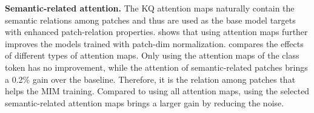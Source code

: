 \documentclass{article} \usepackage{iclr2023_conference,times}
\newcommand{\myPara}[1]{\vspace{-.05in} \noindent\textbf{#1}}
\begin{document}
\myPara{Semantic-related attention.}
The KQ attention maps naturally contain the semantic relations among patches
and thus are used as the base model targets with enhanced patch-relation properties.
 shows that using attention maps further improves the models trained with patch-dim normalization.
 compares the effects of different types of attention maps.
Only using the attention maps of the class token has no improvement, while the attention of semantic-related patches brings a 0.2\% gain over the baseline.
Therefore, it is the relation among patches that helps the MIM training. 
Compared to using all attention maps,
using the selected semantic-related attention maps
brings a larger gain by reducing the noise.


\begin{table}
	\caption{Ablation study on ImageNet-1K fully finetuning setting using ViT-B.}
	\centering
	\footnotesize
\end{table}
\end{document}
